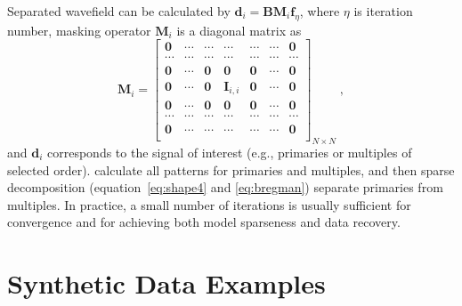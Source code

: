 Separated wavefield can be calculated by
$\mathbf{d}_i=\mathbf{B}\mathbf{M}_i\mathbf{f}_\eta$, where $\eta$ is
iteration number, masking operator $\mathbf{M}_i$ is a diagonal matrix
as
\begin{equation}
  \label{eq:M}
  \mathbf{M}_i =
  \left[\begin{array}{ccccccc}
      \mathbf{0} & \cdots & \cdots & \cdots & \cdots & \cdots & \mathbf{0}\\
      \cdots & \cdots & \cdots & \cdots & \cdots & \cdots & \cdots \\
      \mathbf{0} & \cdots & \mathbf{0} & \mathbf{0} & \mathbf{0} & \cdots & \mathbf{0} \\
       \mathbf{0} & \cdots & \mathbf{0} & \mathbf{I}_{i,i} & \mathbf{0} & \cdots & \mathbf{0}\\
      \mathbf{0} & \cdots & \mathbf{0} & \mathbf{0} & \mathbf{0} & \cdots & \mathbf{0} \\
      \cdots & \cdots & \cdots & \cdots & \cdots & \cdots & \cdots \\
      \mathbf{0} & \cdots & \cdots & \cdots & \cdots & \cdots & \mathbf{0}\\
    \end{array}\right]_{N\times N}\;,
\end{equation}
and $\mathbf{d}_i$ corresponds to
the signal of interest (e.g., primaries or multiples of selected
order).   calculate all patterns for primaries and
multiples, and then  sparse decomposition (equation~\ref{eq:shape4} and
\ref{eq:bregman})   separate primaries from multiples. In practice,
a small number of iterations is usually sufficient for convergence and
for achieving both model sparseness and data recovery. 

 \section{Synthetic Data Examples}

